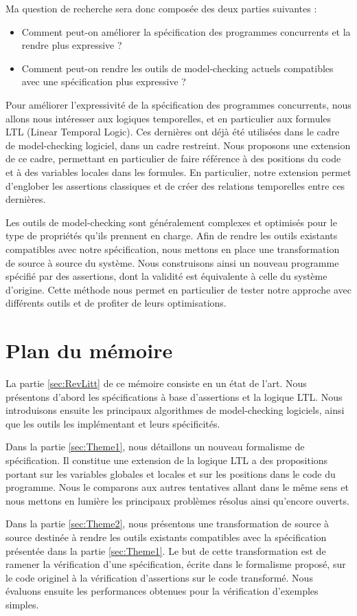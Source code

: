 Ma question de recherche sera donc composée des deux parties suivantes :

\begin{itemize}
\item
  Comment peut-on améliorer la spécification des programmes concurrents
  et la rendre plus expressive ?
\item
  Comment peut-on rendre les outils de model-checking actuels
  compatibles avec une spécification plus expressive ?
\end{itemize}

Pour améliorer l'expressivité de la spécification des programmes concurrents,
nous allons nous intéresser aux logiques temporelles, et en particulier aux
formules LTL (Linear Temporal Logic). Ces dernières ont déjà été utilisées dans
le cadre de model-checking logiciel, dans un cadre restreint. Nous proposons une
extension de ce cadre, permettant en particulier de faire référence à des
positions du code et à des variables locales dans les formules. En particulier,
notre extension permet d'englober les assertions classiques et de créer des
relations temporelles entre ces dernières.

Les outils de model-checking sont généralement complexes et optimisés
pour le type de propriétés qu'ils prennent en charge. Afin de rendre
les outils existants compatibles avec notre spécification, nous mettons
en place une transformation de source à source du système. Nous
construisons ainsi un nouveau programme spécifié par des assertions,
dont la validité est équivalente à celle du système d'origine. Cette
méthode nous permet en particulier de tester notre approche avec
différents outils et de profiter de leurs optimisations.

\section{Plan du mémoire}  %

La partie \ref{sec:RevLitt} de ce mémoire consiste en un état de l'art. Nous présentons
d'abord les spécifications à base d'assertions et la logique \ac{LTL}. Nous
introduisons ensuite les principaux algorithmes de model-checking
logiciels, ainsi que les outils les implémentant et leurs spécificités.

Dans la partie \ref{sec:Theme1}, nous détaillons un nouveau formalisme de
spécification. Il constitue une extension de la logique LTL a des propositions
portant sur les variables globales et locales et sur les positions dans le code
du programme. Nous le comparons aux autres tentatives allant dans le même sens
et nous mettons en lumière les principaux problèmes résolus ainsi qu'encore ouverts.

Dans la partie \ref{sec:Theme2}, nous présentons une transformation de source à
source destinée à rendre les outils existants compatibles avec la spécification
présentée dans la partie \ref{sec:Theme1}. Le but de cette transformation est de
ramener la vérification d'une spécification, écrite dans le formalisme proposé,
sur le code originel à la vérification d'assertions sur le code transformé.
Nous évaluons ensuite les performances obtenues
pour la vérification d'exemples simples.
